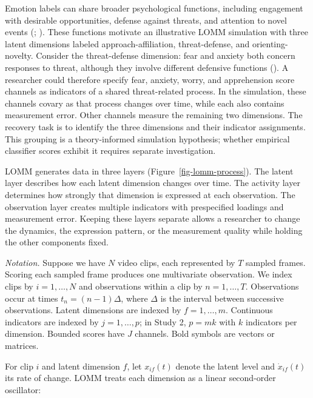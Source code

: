 \documentclass[
]{article}
\begin{document}
Emotion labels can share broader psychological functions, including
engagement with desirable opportunities, defense against threats, and
attention to novel events (; ).
These functions motivate an illustrative LOMM simulation with three
latent dimensions labeled approach-affiliation, threat-defense, and
orienting-novelty. Consider the threat-defense dimension: fear and
anxiety both concern responses to threat, although they involve
different defensive functions
(). A
researcher could therefore specify fear, anxiety, worry, and
apprehension score channels as indicators of a shared threat-related
process. In the simulation, these channels covary as that process
changes over time, while each also contains measurement error. Other
channels measure the remaining two dimensions. The recovery task is to
identify the three dimensions and their indicator assignments. This
grouping is a theory-informed simulation hypothesis; whether empirical
classifier scores exhibit it requires separate investigation.

LOMM generates data in three layers (Figure~\ref{fig-lomm-process}). The
latent layer describes how each latent dimension changes over time. The
activity layer determines how strongly that dimension is expressed at
each observation. The observation layer creates multiple indicators with
prespecified loadings and measurement error. Keeping these layers
separate allows a researcher to change the dynamics, the expression
pattern, or the measurement quality while holding the other components
fixed.

\emph{Notation.} Suppose we have \(N\) video clips, each represented by
\(T\) sampled frames. Scoring each sampled frame produces one
multivariate observation. We index clips by \(i=1,\ldots,N\) and
observations within a clip by \(n=1,\ldots,T\). Observations occur at
times \(t_n=(n-1)\Delta\), where \(\Delta\) is the interval between
successive observations. Latent dimensions are indexed by
\(f=1,\ldots,m\). Continuous indicators are indexed by \(j=1,\ldots,p\);
in Study 2, \(p=mk\) with \(k\) indicators per dimension. Bounded scores
have \(J\) channels. Bold symbols are vectors or matrices.

For clip \(i\) and latent dimension \(f\), let \(x_{if}(t)\) denote the
latent level and \(\dot{x}_{if}(t)\) its rate of change. LOMM treats
each dimension as a linear second-order oscillator:
\end{document}
